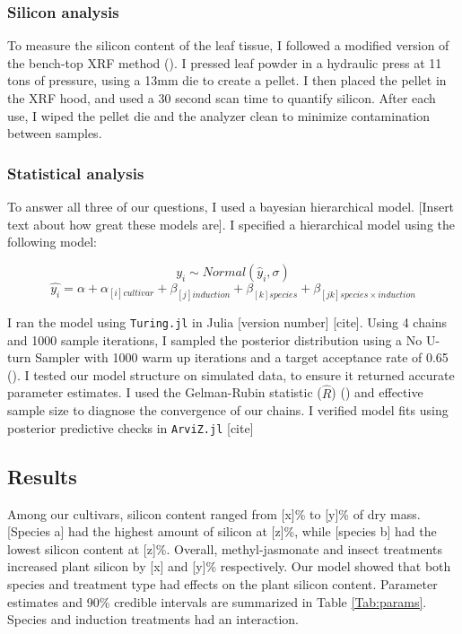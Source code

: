 \documentclass[12pt, letterpaper, ]{article}
\begin{document}
\subsubsection{Silicon analysis}

To measure the silicon content of the leaf tissue, I followed a modified version of the bench-top XRF method (\cite{reidinger_rapid_2012}). I pressed leaf powder in a hydraulic press at 11 tons of pressure, using a 13mm die to create a pellet. I then placed the pellet in the XRF hood, and used a 30 second scan time to quantify silicon. After each use, I wiped the pellet die and the analyzer clean to minimize contamination between samples.

\subsubsection{Statistical analysis}

To answer all three of our questions, I used a bayesian hierarchical model. [Insert text about how great these models are]. I specified a hierarchical model using the following model:

\[y_i \sim Normal(\hat{y}_i, \sigma)\]
\[\hat{y_i} = \alpha + \alpha_{[i]cultivar} + \beta_{[j]induction} + \beta_{[k]species} + \beta_{[jk]species \times induction}\]

I ran the model using \verb|Turing.jl| in Julia [version number] [cite]. Using 4 chains and 1000 sample iterations, I sampled the posterior distribution using a No U-turn Sampler with 1000 warm up iterations and a target acceptance rate of 0.65 (\cite{hoffman_no-u-turn_2014}). I tested our model structure on simulated data, to ensure it returned accurate parameter estimates. I used the Gelman-Rubin statistic (\( \hat{R} \)) (\cite{gelman_inference_1992}) and effective sample size to diagnose the convergence of our chains. I verified model fits using posterior predictive checks in \verb|ArviZ.jl| [cite] 

\subsection{Results}

Among our cultivars, silicon content ranged from [x]\% to [y]\% of dry mass. [Species a] had the highest amount of silicon at [z]\%, while [species b] had the lowest silicon content at [z]\%. Overall, methyl-jasmonate and insect treatments increased plant silicon by [x] and [y]\% respectively. Our model showed that both species and treatment type had effects on the plant silicon content. Parameter estimates and 90\% credible intervals are summarized in Table \ref{Tab:params}. Species and induction treatments had an interaction. 
\end{document}
